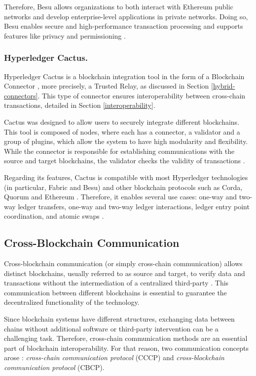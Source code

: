 \documentclass[runningheads]{llncs}
\begin{document}
Therefore, Besu allows organizations to both interact with Ethereum public networks and develop enterprise-level applications in private networks. Doing so, Besu enables secure and high-performance transaction processing and supports features like privacy and permissioning \cite{besu}.


\subsubsection{Hyperledger Cactus.} \label{cactus} Hyperledger Cactus is a blockchain integration tool in the form of a Blockchain Connector \cite{abrunhosa_2021}, more precisely, a Trusted Relay, as discussed in Section \ref{hybrid-connectors}. This type of connector ensures interoperability between cross-chain transactions, detailed in Section \ref{interoperability}. 

Cactus was designed to allow users to securely integrate different blockchains. This tool is composed of nodes, where each has a connector, a validator and a group of plugins, which allow the system to have high modularity and flexibility. While the connector is responsible for establishing communications with the source and target blockchains, the validator checks the validity of transactions \cite{abrunhosa_2021}.

Regarding its features, Cactus is compatible with most Hyperledger technologies (in particular, Fabric and Besu) and other blockchain protocols such as Corda, Quorum and Ethereum \cite{cactus}. Therefore, it enables several use cases: one-way and two-way ledger transfers, one-way and two-way ledger interactions, ledger entry point coordination, and atomic swaps \cite{cactus}.


\subsection{Cross-Blockchain Communication} \label{cross-communication}
Cross-blockchain communication (or simply cross-chain communication) allows distinct blockchains, usually referred to as source and target, to verify data and transactions without the intermediation of a centralized third-party \cite{survey}. This communication between different blockchains is essential to guarantee the decentralized functionality of the technology.

Since blockchain systems have different structures, exchanging data between chains without additional software or third-party intervention can be a challenging task. Therefore, cross-chain communication methods are an essential part of blockchain interoperability. For that reason, two communication concepts arose \cite{survey}: \textit{cross-chain communication protocol} (CCCP) and \textit{cross-blockchain communication protocol} (CBCP).
\end{document}
